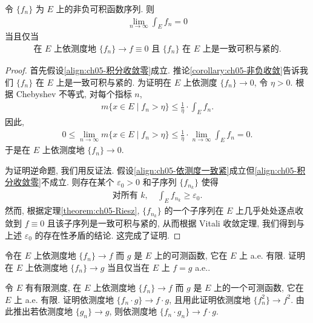 \documentclass[../../main.tex]{subfiles}
\begin{document}
\begin{corollary}\label{corollary:ch05-依测度积分收敛}
令 $\{f_{n}\}$ 为 $E$ 上的非负可积函数序列. 则
\begin{align}
\lim_{n\to\infty}\int_{E}f_{n}=0\label{align:ch05-积分收敛零}
\end{align}
当且仅当
\begin{align}
\text{在 }E\text{ 上依测度地 }\{f_{n}\}\to f\equiv 0\text{ 且 }\{f_{n}\}\text{ 在 }E\text{ 上是一致可积与紧的}.\label{align:ch05-依测度一致紧}
\end{align}
\end{corollary}

\begin{proof}
首先假设\eqref{align:ch05-积分收敛零}成立. 推论\cref{corollary:ch05-非负收敛}告诉我们 $\{f_{n}\}$ 在 $E$ 上是一致可积与紧的. 为证明在 $E$ 上依测度 $\{f_{n}\}\to 0$, 令 $\eta>0$. 根据 Chebyshev 不等式, 对每个指标 $n$,
\begin{align*}
m\{x\in E\mid f_{n}>\eta\}\leqslant\frac{1}{\eta}\cdot\int_{E}f_{n}.
\end{align*}
因此,
\begin{align*}
0\leqslant\lim_{n\to\infty}m\{x\in E\mid f_{n}>\eta\}\leqslant\frac{1}{\eta}\cdot\lim_{n\to\infty}\int_{E}f_{n}=0.
\end{align*}
于是在 $E$ 上依测度地 $\{f_{n}\}\to 0$.

为证明逆命题, 我们用反证法. 假设\eqref{align:ch05-依测度一致紧}成立但\eqref{align:ch05-积分收敛零}不成立. 则存在某个 $\varepsilon_{0}>0$ 和子序列 $\{f_{n_{k}}\}$ 使得
\begin{align*}
\text{对所有 }k,\quad\int_{E}f_{n_{k}}\geqslant\varepsilon_{0}.
\end{align*}
然而, 根据定理\cref{theorem:ch05-Riesz}, $\{f_{n_{k}}\}$ 的一个子序列在 $E$ 上几乎处处逐点收敛到 $f\equiv 0$ 且该子序列是一致可积与紧的, 从而根据 Vitali 收敛定理, 我们得到与上述 $\varepsilon_{0}$ 的存在性矛盾的结论. 这完成了证明.
\end{proof}

\begin{exercise}\label{exercise:ch05-06}
令在 $E$ 上依测度地 $\{f_{n}\}\to f$ 而 $g$ 是 $E$ 上的可测函数, 它在 $E$ 上 a.e. 有限. 证明在 $E$ 上依测度地 $\{f_{n}\}\to g$ 当且仅当在 $E$ 上 $f=g$ a.e..
\end{exercise}

\begin{exercise}\label{exercise:ch05-07}
令 $E$ 有有限测度, 在 $E$ 上依测度地 $\{f_{n}\}\to f$ 而 $g$ 是 $E$ 上的一个可测函数, 它在 $E$ 上 a.e. 有限. 证明依测度地 $\{f_{n}\cdot g\}\to f\cdot g$, 且用此证明依测度地 $\{f_{n}^{2}\}\to f^{2}$. 由此推出若依测度地 $\{g_{n}\}\to g$, 则依测度地 $\{f_{n}\cdot g_{n}\}\to f\cdot g$.
\end{exercise}
\end{document}
